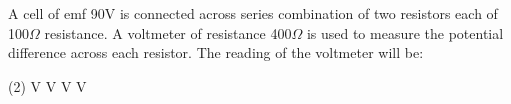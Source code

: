 \item A cell of emf 90V is connected across series combination of two resistors each of 100$\Omega$ resistance. A voltmeter of resistance 400$\Omega$ is used to measure the potential difference across each resistor. The reading of the voltmeter will be:
    \begin{tasks}(2)
         V
         V
         V
         V
    \end{tasks}